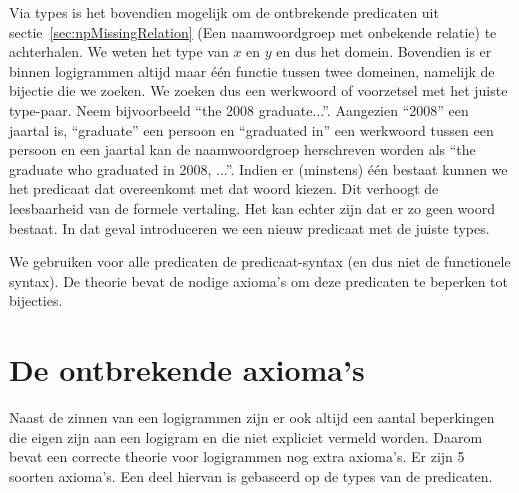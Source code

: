 Via types is het bovendien mogelijk om de ontbrekende predicaten uit sectie~\ref{sec:npMissingRelation} (Een naamwoordgroep met onbekende relatie) te achterhalen. We weten het type van $x$ en $y$ en dus het domein. Bovendien is er binnen logigrammen altijd maar één functie tussen twee domeinen, namelijk de bijectie die we zoeken. We zoeken dus een werkwoord of voorzetsel met het juiste type-paar. Neem bijvoorbeeld ``the 2008 graduate...''. Aangezien ``2008'' een jaartal is, ``graduate'' een persoon en ``graduated in'' een werkwoord tussen een persoon en een jaartal kan de naamwoordgroep herschreven worden als ``the graduate who graduated in 2008, ...''.  Indien er (minstens) één bestaat kunnen we het predicaat dat overeenkomt met dat woord kiezen. Dit verhoogt de leesbaarheid van de formele vertaling. Het kan echter zijn dat er zo geen woord bestaat. In dat geval introduceren we een nieuw predicaat met de juiste types.

We gebruiken voor alle predicaten de predicaat-syntax (en dus niet de functionele syntax). De theorie bevat de nodige axioma's om deze predicaten te beperken tot bijecties.



\section{De ontbrekende axioma's}
Naast de zinnen van een logigrammen zijn er ook altijd een aantal beperkingen die eigen zijn aan een logigram en die niet expliciet vermeld worden. Daarom bevat een correcte theorie voor logigrammen nog extra axioma's. Er zijn 5 soorten axioma's. Een deel hiervan is gebaseerd op de types van de predicaten.

